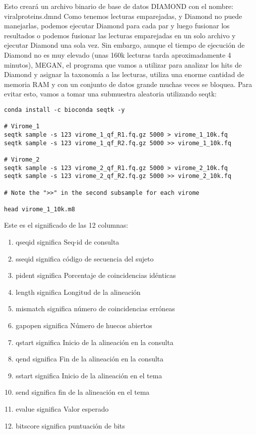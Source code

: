 Esto creará un archivo binario de base de datos DIAMOND con el nombre: viralproteins.dmnd
Como tenemos lecturas emparejadas, y Diamond no puede manejarlas, podemos ejecutar Diamond para cada par y luego fusionar los resultados o podemos fusionar las lecturas emparejadas en un solo archivo y ejecutar Diamond una sola vez.
Sin embargo, aunque el tiempo de ejecución de Diamond no es muy elevado (unas 160k lecturas tarda aproximadamente 4 minutos), MEGAN, el programa que vamos a utilizar para analizar los hits de Diamond y asignar la taxonomía a las lecturas, utiliza una enorme cantidad de memoria RAM y con un conjunto de datos grande muchas veces se bloquea. Para evitar esto, vamos a tomar una submuestra aleatoria utilizando seqtk:
\begin{lstlisting}
conda install -c bioconda seqtk -y

# Virome_1
seqtk sample -s 123 virome_1_qf_R1.fq.gz 5000 > virome_1_10k.fq
seqtk sample -s 123 virome_1_qf_R2.fq.gz 5000 >> virome_1_10k.fq

# Virome_2
seqtk sample -s 123 virome_2_qf_R1.fq.gz 5000 > virome_2_10k.fq
seqtk sample -s 123 virome_2_qf_R2.fq.gz 5000 >> virome_2_10k.fq

# Note the ">>" in the second subsample for each virome

head virome_1_10k.m8
\end{lstlisting}

Este es el significado de las 12 columnas:
\begin{enumerate}
\item qseqid significa Seq-id de consulta
\item sseqid significa código de secuencia del sujeto
\item pident significa Porcentaje de coincidencias idénticas
\item length significa Longitud de la alineación
\item mismatch significa número de coincidencias erróneas
\item gapopen significa Número de huecos abiertos
\item qstart significa Inicio de la alineación en la consulta
\item qend significa Fin de la alineación en la consulta
\item sstart significa Inicio de la alineación en el tema
\item send significa fin de la alineación en el tema
\item evalue significa Valor esperado
\item bitscore significa puntuación de bits
\end{enumerate}

